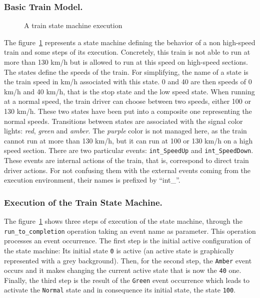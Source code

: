 \documentclass[english, 10pt]{llncs}
\begin{document}
\subsubsection{Basic Train Model.}

\begin{figure}[htbp]
\begin{center}
\caption{A train state machine execution}
\label{train-exec}
\end{center}
\end{figure}

The figure~\ref{train-exec} represents a state machine defining the
behavior of a non high-speed train and some steps of its
execution. Concretely, this train is not able to run at more than 130
km/h but is allowed to run at this speed on high-speed sections. The
states define the speeds of the train. For simplifying, the name of a
state is the train speed in km/h associated with this state. 0 and 40
are then speeds of 0 km/h and 40 km/h, that is the stop state and the
low speed state. When running at a normal speed, the train driver can
choose between two speeds, either 100 or 130 km/h. These two states
have been put into a composite one representing the normal
speeds. Transitions between states are associated with the signal
color lights: \textit{red}, \textit{green} and \textit{amber}. The
\textit{purple} color is not managed here, as the train cannot run at
more than 130 km/h, but it can run at 100 or 130 km/h on a high speed
section. There are two particular events: \texttt{int\_SpeedUp} and
\texttt{int\_Speed\-Down}. These events are internal actions of the
train, that is, correspond to direct train driver actions. For not
confusing them with the external events coming from the execution
environment, their names is prefixed by ``int\_''.

\subsubsection{Execution of the Train State Machine.}

The figure~\ref{train-exec} shows three steps of execution of the
state machine, through the \texttt{run\_to\_completion} operation
taking an event name as parameter. This operation processes an event
occurrence. The first step is the initial active configuration of the
state machine: Its initial state \texttt{0} is active (an active state
is graphically represented with a grey background). Then, for the second
step, the \texttt{Amber} event occurs and it makes changing the
current active state that is now the \texttt{40} one. Finally, the
third step is the result of the \texttt{Green} event occurrence which
leads to activate the \texttt{Normal} state and in consequence its
initial state, the state \texttt{100}.
\end{document}
